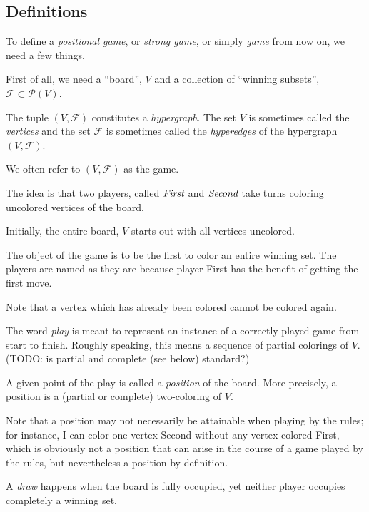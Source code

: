 \subsection{Definitions}

To define a \emph{positional game}, or \emph{strong game}, or simply \emph{game} from now on, we need a few things.

First of all, we need a ``board'', $V$ and a collection of ``winning subsets'', $\mathcal F \subset \mathcal P(V)$.

The tuple $(V,\mathcal F)$ constitutes a \emph{hypergraph}.
The set $V$ is sometimes called the \emph{vertices} and the set $\mathcal F$ is sometimes called the \emph{hyperedges} of the hypergraph $(V,\mathcal F)$.

\begin{remark}
We often refer to $(V,\mathcal F)$ as the game.
\end{remark}

The idea is that two players, called $\emph{First}$ and $\emph{Second}$ take turns coloring uncolored vertices of the board.

Initially, the entire board, $V$ starts out with all vertices uncolored.

The object of the game is to be the first to color an entire winning set.
The players are named as they are because player First has the benefit of getting the first move.

Note that a vertex which has already been colored cannot be colored again.

The word \emph{play} is meant to represent an instance of a correctly played game from start to finish.
Roughly speaking, this means a sequence of partial colorings of $V$.
(TODO: is partial and complete (see below) standard?)

A given point of the play is called a \emph{position} of the board.
More precisely, a position is a (partial or complete) two-coloring of $V$.

\begin{remark}
Note that a position may not necessarily be attainable when playing by the rules; for instance, I can color one vertex Second without any vertex colored First, which is obviously not a position that can arise in the course of a game played by the rules, but nevertheless a position by definition.
\end{remark}

A \emph{draw} happens when the board is fully occupied, yet neither player occupies completely a winning set.

